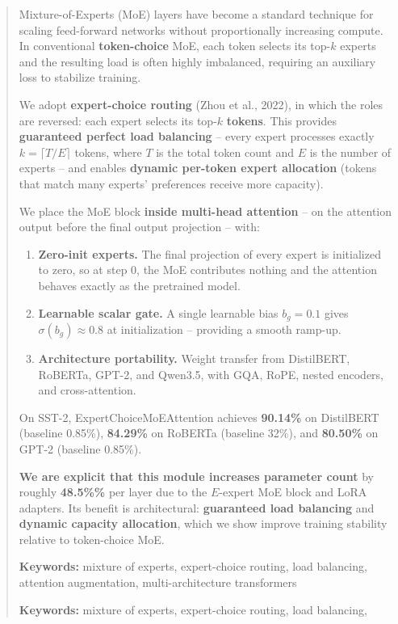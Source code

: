 \documentclass{article}
\begin{document}
\maketitle

\begin{abstract}
Mixture-of-Experts (MoE) layers have become a standard technique for scaling 
feed-forward networks without proportionally increasing compute. In 
conventional \textbf{token-choice} MoE, each token selects its top-$k$ experts 
and the resulting load is often highly imbalanced, requiring an auxiliary 
loss to stabilize training.

We adopt \textbf{expert-choice routing} (Zhou et al., 2022), in which the roles 
are reversed: each expert selects its top-$k$ \textbf{tokens}. This provides 
\textbf{guaranteed perfect load balancing} -- every expert processes exactly 
$k = \lceil T / E \rceil$ tokens, where $T$ is the total token count and $E$ 
is the number of experts -- and enables \textbf{dynamic per-token expert allocation} 
(tokens that match many experts' preferences receive more capacity).

We place the MoE block \textbf{inside multi-head attention} -- on the attention 
output before the final output projection -- with:

\begin{enumerate}
\item \textbf{Zero-init experts.} The final projection of every expert is initialized
  to zero, so at step 0, the MoE contributes nothing and the attention
  behaves exactly as the pretrained model.
\item \textbf{Learnable scalar gate.} A single learnable bias $b_g = 0.1$
  gives $\sigma(b_g) \approx 0.8$ at initialization --
  providing a smooth ramp-up.
\item \textbf{Architecture portability.} Weight transfer from DistilBERT, RoBERTa,
  GPT-2, and Qwen3.5, with GQA, RoPE, nested encoders, and cross-attention.

\end{enumerate}
On SST-2, ExpertChoiceMoEAttention achieves \textbf{90.14\%} on DistilBERT 
(baseline 0.85\%), \textbf{84.29\%} on RoBERTa (baseline 32\%), 
and \textbf{80.50\%} on GPT-2 (baseline 0.85\%).

\textbf{We are explicit that this module increases parameter count} by roughly 
\textbf{48.5\%\%} per layer due to the $E$-expert MoE block and LoRA 
adapters. Its benefit is architectural: \textbf{guaranteed load balancing} and 
\textbf{dynamic capacity allocation}, which we show improve training stability 
relative to token-choice MoE.

\textbf{Keywords:} mixture of experts, expert-choice routing, load balancing, 
attention augmentation, multi-architecture transformers



\vspace{0.5em}
\noindent\textbf{Keywords:} mixture of experts, expert-choice routing, load balancing,
\end{abstract}
\end{document}
